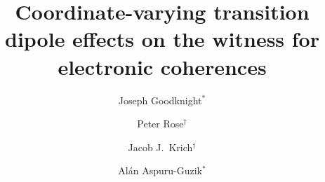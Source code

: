 



\title{Coordinate-varying transition dipole effects on the witness for electronic coherences}

\author{Joseph Goodknight$^*$}
\author{Peter Rose$^{\dagger}$}
\author{Jacob J.\ Krich$^{\dagger}$}
\author{Al\'an Aspuru-Guzik$^*$}
\

\begin{abstract}
  
\end{abstract}

\maketitle








